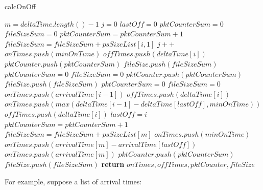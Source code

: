 \begin{algorithm}[t!]
    \caption{calcOnOff}
    \label{alg:calcOnOff}
    \begin{algorithmic}[1]
        \small
        \State $m = deltaTime.length() - 1$
        \State $j = 0$
        \State $lastOff = 0$
        \State $pktCounterSum = 0$
        \State $fileSizeSum = 0$
        \State $pktCounterSum = pktCounterSum + 1$
        \State $fileSizeSum = fileSizeSum + psSizeList[i, 1]$
         
        \State $j++$
        \State $onTimes.push(minOnTime)$
        \State $offTimes.push(deltaTime[i])$
        \State $pktCounter.push(pktCounterSum)$
        \State $fileSize.push(fileSizeSum)$
        \State $pktCounterSum = 0$
        \State $fileSizeSum = 0$
        \Else {} 
        \State $pktCounter.push(pktCounterSum)$
        \State $fileSize.push(fileSizeSum)$
        \State $pktCounterSum = 0$
        \State $fileSizeSum = 0$
        \State $onTimes.push(arrivalTime[i - 1])$
        \State $offTimes.push(deltaTime[i])$
        \Else {} 
        \State  $onTimes.push(max(deltaTime[i-1] - deltaTime[lastOff], minOnTime))$ 
        \State  $offTimes.push(deltaTime[i])$
        \EndIf
        \State $lastOff = i$
        \EndIf 
        \EndIf       
        \EndFor
        \State $pktCounterSum = pktCounterSum + 1$
        \State $fileSizeSum = fileSizeSum + psSizeList[m]$
         
        \State $onTimes.push(minOnTime)$ %
        \Else {}
        \State $onTimes.push(arrivalTime[m] - arrivalTime[lastOff])$ 
        \Else 
        \State $onTimes.push(arrivalTime[m])$ 
        \EndIf
        \EndIf
        \State $pktCounter.push(pktCounterSum)$
        \State $fileSize.push(fileSizeSum)$
        \State \textbf{return} $onTimes, offTimes, pktCounter, fileSize$
        \EndFunction
    \end{algorithmic}
\end{algorithm}


For example, suppose a list of arrival times: 


